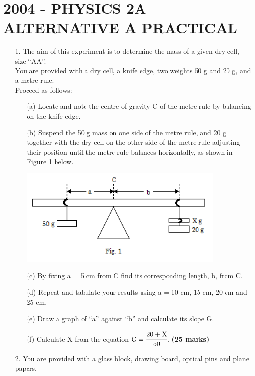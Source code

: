 \section{2004 - PHYSICS 2A ALTERNATIVE A PRACTICAL}

\begin{enumerate}
\item[1.] The aim of this experiment is to determine the mass of a given dry cell, size ``AA''.\\[5pt]

You are provided with a dry cell, a knife edge, two weights 50 g and 20 g, and a metre rule.\\[5pt]

Proceed as follows:
\begin{enumerate}
\item[(a)] Locate and note the centre of gravity C of the metre rule by balancing on the knife edge.
\item[(b)] Suspend the 50 g mass on one side of the metre rule, and 20 g together with the dry cell on the other side of the metre rule adjusting their position until the metre rule balances horizontally, as shown in Figure 1 below.

\begin{center}
\includegraphics[width=10cm]{./img/2004-1-alt.png}
\end{center}

\item[(c)] By fixing a = 5 cm from C find its corresponding length, b, from C.
\item[(d)] Repeat and tabulate your results using a = 10 cm, 15 cm, 20 cm and 25 cm.
\item[(e)] Draw a graph of ``a'' against ``b'' and calculate its slope G.
\item[(f)] Calculate X from the equation $\text{G} = \cfrac{20 + \text{X}}{50}$. \hfill \textbf{(25 marks)}
\end{enumerate}


\item[2.] You are provided with a glass block, drawing board, optical pins and plane papers.\\


\end{enumerate}
